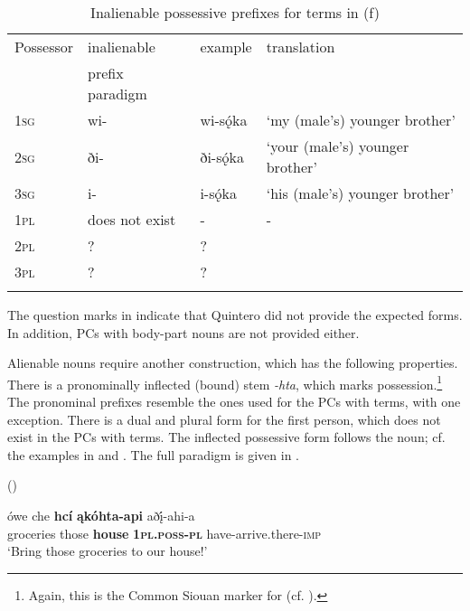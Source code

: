 \documentclass[output=paper]{LSP/langsci}
\begin{document}
\begin{table}
\caption{Inalienable possessive prefixes for  terms in  (\citealt[481]{Quintero2004}f)} \label{osageinalienable}
\begin{tabular}{ l l l l }
\lsptoprule
Possessor	 & inalienable & example & translation \\
& prefix paradigm & & \\
\midrule
\textsc{1sg} & wi-	& wi-sǫ́ka & `my (male's) younger brother' \\
 
\textsc{2sg} & ði- & ði-sǫ́ka & `your (male's) younger brother' \\
 
\textsc{3sg} & i- & i-sǫ́ka & `his (male's) younger brother' \\
 
\textsc{1pl} & does not exist &	- & - \\
 
\textsc{2pl} & ? & ? & \\
 
\textsc{3pl} & ? & ? & \\
\lspbottomrule
\end{tabular}
\end{table}
 
The question marks in  indicate that Quintero did not provide the expected forms. In addition, PCs with  body-part nouns are not provided either.

Alienable nouns require another construction, which has the following properties. There is a pronominally inflected (bound) stem \textit{-hta}, which marks possession.\footnote{Again, this is the Common Siouan marker for  (cf. \citealt{RankinEtAl2015AccessMay}).} The pronominal prefixes resemble the ones used for the PCs with   terms, with one exception. There is a dual and plural form for the first person, which does not exist in the PCs with   terms. The inflected possessive form follows the  noun; cf. the examples in  and . The full paradigm is given in .

\ea	{} (\citealt[298]{Quintero2004}) \label{osagegroceries}

\gll ówe  che    \textbf{hc\'i} \textbf{\k{a}kóhta-api}  aðį́-ahi-a \\
groceries  those \textbf{house} \textbf{\textsc{1pl.poss-pl}}   have-arrive.there-\textsc{imp} \\
\glt `Bring those groceries to our house!'
\end{document}
